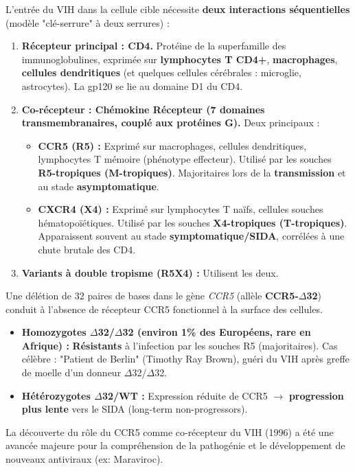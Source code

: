 \documentclass[11pt]{article}
\begin{document}
\begin{propriete}
L'entrée du VIH dans la cellule cible nécessite \textbf{deux interactions séquentielles} (modèle "clé-serrure" à deux serrures) :
\begin{enumerate}
    \item \textbf{Récepteur principal : CD4.} Protéine de la superfamille des immunoglobulines, exprimée sur \textbf{lymphocytes T CD4+}, \textbf{macrophages}, \textbf{cellules dendritiques} (et quelques cellules cérébrales : microglie, astrocytes). La gp120 se lie au domaine D1 du CD4.
    \item \textbf{Co-récepteur : Chémokine Récepteur (7 domaines transmembranaires, couplé aux protéines G).} Deux principaux :
    \begin{itemize}
        \item \textbf{CCR5 (R5) :} Exprimé sur macrophages, cellules dendritiques, lymphocytes T mémoire (phénotype effecteur). Utilisé par les souches \textbf{R5-tropiques (M-tropiques)}. Majoritaires lors de la \textbf{transmission} et au stade \textbf{asymptomatique}.
        \item \textbf{CXCR4 (X4) :} Exprimé sur lymphocytes T naïfs, cellules souches hématopoïétiques. Utilisé par les souches \textbf{X4-tropiques (T-tropiques)}. Apparaissent souvent au stade \textbf{symptomatique/SIDA}, corrélées à une chute brutale des CD4.
    \end{itemize}
    \item \textbf{Variants à double tropisme (R5X4) :} Utilisent les deux.
\end{enumerate}
\end{propriete}

\begin{savaistu}
Une délétion de 32 paires de bases dans le gène \emph{CCR5} (allèle \textbf{CCR5-$\Delta$32}) conduit à l'absence de récepteur CCR5 fonctionnel à la surface des cellules.
\begin{itemize}
    \item \textbf{Homozygotes $\Delta$32/$\Delta$32 (environ 1\% des Européens, rare en Afrique) :} \textbf{Résistants} à l'infection par les souches R5 (majoritaires). Cas célèbre : "Patient de Berlin" (Timothy Ray Brown), guéri du VIH après greffe de moelle d'un donneur $\Delta$32/$\Delta$32.
    \item \textbf{Hétérozygotes $\Delta$32/WT :} Expression réduite de CCR5 $\rightarrow$ \textbf{progression plus lente} vers le SIDA (long-term non-progressors).
\end{itemize}
La découverte du rôle du CCR5 comme co-récepteur du VIH (1996) a été une avancée majeure pour la compréhension de la pathogénie et le développement de nouveaux antiviraux (ex: Maraviroc).
\end{savaistu}
\end{document}
